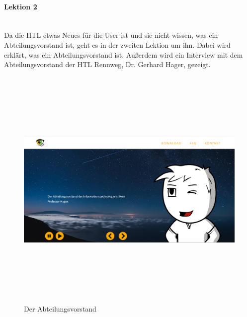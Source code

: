 \paragraph{Lektion 2} \leavevmode \\
Da die HTL etwas Neues für die User ist und sie nicht wissen, was ein Abteilungsvorstand ist, geht es in der zweiten Lektion um ihn. Dabei wird erklärt, was ein Abteilungsvorstand ist. Außerdem wird ein Interview mit dem Abteilungsvorstand der HTL Rennweg, Dr. Gerhard Hager, gezeigt. 
\begin{figure}[h]
	\centering
\includegraphics[width=12cm,height=12cm,keepaspectratio]{webseite_abb13} 
	\caption{Der Abteilungsvorstand}
\end{figure}
